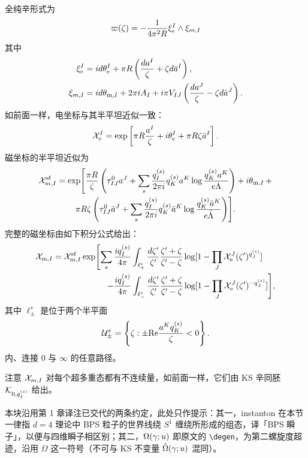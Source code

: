 全纯辛形式为
\begin{equation}
\varpi(\zeta) = - \frac{1}{4 \pi^2 R} \xi^I_e \wedge \xi_{m,I}
\end{equation}
其中
\begin{align}
\xi_e^I &= i d \theta_{\mathrm{e}}^I + \pi R \left(\frac{da^I}{\zeta} +
\zeta d \bar a^I \right), \\
\xi_{m,I} &= i d \theta_{\mathrm{m},I} + 2 \pi i A_I + i \pi V_{IJ} \left(
\frac{da^J}{\zeta} - \zeta d \bar a^J \right).
\end{align}
如前面一样，电坐标与其半平坦近似一致：
\begin{equation}
\mathcal{X}^I_e = \exp \left[ \pi R \frac{a^I}{\zeta} + i \theta_{\mathrm{e}}^I +
\pi R \zeta \bar a^I \right].
\end{equation}
磁坐标的半平坦近似为
\begin{multline}
\mathcal{X}^{\mathrm{sf}}_{m,I} = \exp \Biggl[ \frac{\pi R}{\zeta} \left(\tau^0_{IJ}
a^J  + \sum_s \frac{q^{(s)}_I}{2 \pi i} q^{(s)}_K a^K \log
\frac{q^{(s)}_K a^K}{e \Lambda}\right) + i \theta_{\mathrm{m},I}\,+ \\
\pi R \zeta
\left( \tau^0_{IJ} \bar a^J + \sum_s \frac{q^{(s)}_I}{2 \pi
i} q^{(s)}_K \bar a^K \log \frac{q^{(s)}_K \bar a^K}{e \bar
\Lambda}\right) \Biggr].
\end{multline}
完整的磁坐标由如下积分公式给出：
\begin{equation}\label{eq:FullX2-r}
\begin{split}
\mathcal{X}_{\mathrm{m},I} = \mathcal{X}_{\mathrm{m},I}^{\mathrm{sf}} \exp\Biggl[ \sum_s \frac{i
q^{(s)}_I}{4\pi} & \int_{\ell^s_+} \frac{d \zeta'}{\zeta'}
\frac{\zeta' + \zeta}{\zeta' - \zeta} \log[1-\prod_J \mathcal{X}^J_{\mathrm{e}}(\zeta')^{q^{(s)}_J}]  \\
- \frac{i q^{(s)}_I}{4\pi} & \int_{\ell^s_-}
 \frac{d \zeta'}{\zeta'} \frac{\zeta' + \zeta}{\zeta' - \zeta} \log[1-\prod_J \mathcal{X}^J_{\mathrm{e}}(\zeta')^{-q^{(s)}_J}] \Biggr],
\end{split}
\end{equation}
其中 $\ell^s_\pm$ 是位于两个半平面
\begin{equation}
\mathcal{U}^s_\pm = \left\{ \zeta: \pm {\rm Re} \frac{a^K q^{(s)}_K}{\zeta}<0 \right\}.
\end{equation}
内、连接 $0$ 与 $\infty$ 的任意路径。

注意 $\mathcal{X}_{m,I}$ 对每个超多重态都有不连续量，如前面一样，它们由 KS 辛同胚 $\mathcal{K}_{0,q_I^{(s)}}$ 给出。

\begin{yizhu}
本块沿用第 1 章译注已交代的两条约定，此处只作提示：其一，instanton 在本节一律指 $d=4$ 理论中 BPS 粒子的世界线绕 $S^1$ 缠绕所形成的组态，译「BPS 瞬子」，以便与四维瞬子相区别；其二，$\Omega(\gamma;u)$ 即原文的 \verb|\degen|，为第二螺旋度超迹，沿用 $\Omega$ 这一符号（不可与 KS 不变量 $\hat{\Omega}(\gamma;u)$ 混同）。
\end{yizhu}
